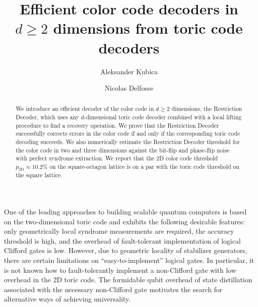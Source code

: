 \documentclass[onecolumn,letterpaper,11pt,accepted=2022-12-19]{quantumarticle}
\newcommand{\psqoct}{10.2\%}
\theoremstyle{definition}
\theoremstyle{lemma}
\theoremstyle{theorem}
\theoremstyle{corollary}
\begin{document}
\title{Efficient color code decoders in $d\geq 2$ dimensions from toric code decoders}

\author{Aleksander Kubica}
\author{Nicolas Delfosse}


\begin{abstract}
We introduce an efficient decoder of the color code in $d\geq 2$ dimensions, the Restriction Decoder, which uses any $d$-dimensional toric code decoder combined with a local lifting procedure to find a recovery operation.
We prove that the Restriction Decoder successfully corrects errors in the color code if and only if the corresponding toric code decoding succeeds.
We also numerically estimate the Restriction Decoder threshold for the color code in two and three dimensions against the bit-flip and phase-flip noise with perfect syndrome extraction.
We report that the 2D color code threshold $p_{\textrm{2D}} \approx \psqoct$ on the square-octagon lattice is on a par with the toric code threshold on the square lattice.
\end{abstract}


\maketitle




One of the leading approaches to building scalable quantum computers is based on the two-dimensional toric code \cite{Kitaev2003, Bravyi1998, Dennis2002} and exhibits the following desirable features: only geometrically local syndrome measurements are required, the accuracy threshold is high, and the overhead of fault-tolerant implementation of logical Clifford gates is low.
However, due to geometric locality of stabilizer generators, there are certain limitations \cite{Zeng2011,Eastin2009,Bravyi2013, Pastawski2014,Jochym-OConnor2018} on ``easy-to-implement'' logical gates.
In particular, it is not known how to fault-tolerantly implement a non-Clifford gate with low overhead in the 2D toric code.
The formidable qubit overhead of state distillation \cite{Bravyi2005, Fowler2012} associated with the necessary non-Clifford gate motivates the search for alternative ways of achieving universality.
\end{document}
